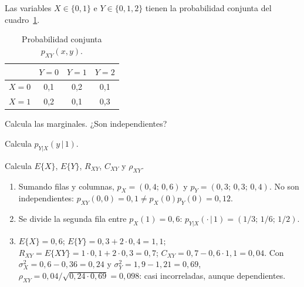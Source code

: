 \documentclass[11pt,a4paper]{scrartcl}
\begin{document}
\begin{ejercicio}
  Las variables $X\in\{0,1\}$ e $Y\in\{0,1,2\}$ tienen la probabilidad conjunta del cuadro~\ref{tab:conjunta}.
  \begin{table}[h]
    \centering
    \begin{tabular}{c|ccc}
      & $Y=0$ & $Y=1$ & $Y=2$\\\hline
      $X=0$ & 0,1 & 0,2 & 0,1\\
      $X=1$ & 0,2 & 0,1 & 0,3
    \end{tabular}
    \caption{Probabilidad conjunta $p_{XY}(x,y)$.}
    \label{tab:conjunta}
  \end{table}
  \begin{incisos}[1]
    \item Calcula las marginales. ¿Son independientes?
    \item Calcula $p_{Y|X}(y\,|\,1)$.
    \item Calcula $E\{X\}$, $E\{Y\}$, $R_{XY}$, $C_{XY}$ y $\rho_{XY}$.
  \end{incisos}
\end{ejercicio}
\begin{solucion}
  \begin{enumerate}[label=\alph*)]
    \item Sumando filas y columnas, $p_X=(0{,}4;\,0{,}6)$ y $p_Y=(0{,}3;\,0{,}3;\,0{,}4)$. No son independientes: $p_{XY}(0,0)=0{,}1\ne p_X(0)p_Y(0)=0{,}12$.
    \item Se divide la segunda fila entre $p_X(1)=0{,}6$: $p_{Y|X}(\cdot\,|\,1)=(1/3;\,1/6;\,1/2)$.
    \item $E\{X\}=0{,}6$; $E\{Y\}=0{,}3+2\cdot0{,}4=1{,}1$; $R_{XY}=E\{XY\}=1\cdot0{,}1+2\cdot0{,}3=0{,}7$; $C_{XY}=0{,}7-0{,}6\cdot1{,}1=0{,}04$. Con $\sigma_X^2=0{,}6-0{,}36=0{,}24$ y $\sigma_Y^2=1{,}9-1{,}21=0{,}69$, $\rho_{XY}=0{,}04/\sqrt{0{,}24\cdot0{,}69}=0{,}098$: casi incorreladas, aunque dependientes.
  \end{enumerate}
\end{solucion}
\end{document}
